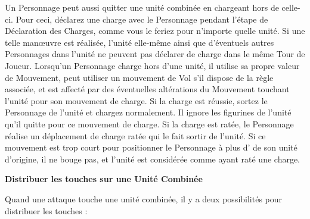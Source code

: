Un Personnage peut aussi quitter une unité combinée en chargeant hors de celle-ci. Pour ceci, déclarez une charge avec le Personnage pendant l'étape de Déclaration des Charges, comme vous le feriez pour n'importe quelle unité. Si une telle manœuvre est réalisée, l'unité elle-même ainsi que d'éventuels autres Personnages dans l'unité ne peuvent pas déclarer de charge dans le même Tour de Joueur.  Lorsqu'un Personnage charge hors d'une unité, il utilise sa propre valeur de Mouvement, peut utiliser un mouvement de Vol s'il dispose de la règle associée, et est affecté par des éventuelles altérations du Mouvement touchant l'unité pour son mouvement de charge. Si la charge est réussie, sortez le Personnage de l'unité et chargez normalement. Il ignore les figurines de l'unité qu'il quitte pour ce mouvement de charge. Si la charge est ratée, le Personnage réalise un déplacement de charge ratée qui le fait sortir de l'unité. Si ce mouvement est trop court pour positionner le Personnage à plus d' de son unité d'origine, il ne bouge pas, et l'unité est considérée comme ayant raté une charge.

\noindent\textbf{Distribuer les touches sur une Unité Combinée}

Quand une attaque touche une unité combinée, il y a deux possibilités pour distribuer les touches :

